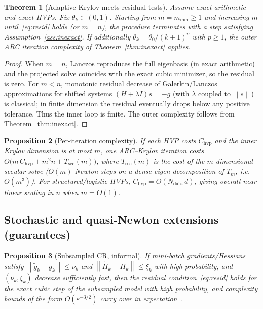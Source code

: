 \documentclass[11pt,a4paper]{article}
\newtheorem{theorem}{Theorem}[section]
\newtheorem{proposition}[theorem]{Proposition}
\newcommand{\norm}[1]{\left\|#1\right\|}
\begin{document}
\begin{theorem}[Adaptive Krylov meets residual tests]
\label{thm:krylov-adapt}
Assume exact arithmetic and exact HVPs.
Fix $\theta_{k}\in(0,1)$.
Starting from $m=m_{\min}\ge 1$ and increasing $m$ until~\eqref{eq:resid} holds (or $m=n$), the procedure terminates with a step satisfying Assumption~\ref{ass:inexact}.
If additionally $\theta_{k}=\theta_{0}/(k+1)^{p}$ with $p\ge 1$, the outer ARC iteration complexity of Theorem~\ref{thm:inexact} applies.
\end{theorem}

\begin{proof}
When $m=n$, Lanczos reproduces the full eigenbasis (in exact arithmetic) and the projected solve coincides with the exact cubic minimizer, so the residual is zero.
For $m<n$, monotonic residual decrease of Galerkin/Lanczos approximations for shifted systems $(H+\lambda I)s=-g$ (with $\lambda$ coupled to $\norm{s}$) is classical; in finite dimension the residual eventually drops below any positive tolerance.
Thus the inner loop is finite.
The outer complexity follows from Theorem~\ref{thm:inexact}.
\end{proof}

\begin{proposition}[Per-iteration complexity]
\label{prop:cost}
If each HVP costs $C_{\mathrm{hvp}}$ and the inner Krylov dimension is at most $m$, one ARC--Krylov iteration costs
$O\bigl(m\,C_{\mathrm{hvp}}+m^{2}n+T_{\mathrm{sec}}(m)\bigr)$,
where $T_{\mathrm{sec}}(m)$ is the cost of the $m$-dimensional secular solve ($O(m)$ Newton steps on a dense eigen-decomposition of $T_{m}$, i.e.\ $O(m^{3})$).
For structured/logistic HVPs, $C_{\mathrm{hvp}}=O(N_{\mathrm{data}}\,d)$, giving overall near-linear scaling in $n$ when $m=O(1)$.
\end{proposition}

\subsection{Stochastic and quasi-Newton extensions (guarantees)}

\begin{proposition}[Subsampled CR, informal]
\label{prop:stoch}
If mini-batch gradients/Hessians satisfy
$\norm{\tilde g_{k}-g_{k}}\le\nu_{k}$ and $\norm{\tilde H_{k}-H_{k}}\le\xi_{k}$ with high probability, and $(\nu_{k},\xi_{k})$ decrease sufficiently fast, then the residual condition~\eqref{eq:resid} holds for the exact cubic step of the subsampled model with high probability, and complexity bounds of the form $O(\varepsilon^{-3/2})$ carry over in expectation~\cite{kohler2017subsampled,xu2016sub}.
\end{proposition}
\end{document}
